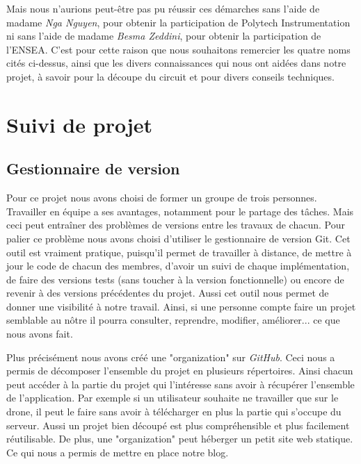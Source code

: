 \documentclass[a4paper,10pt]{report}
\begin{document}
    Mais nous n'aurions peut-être pas pu réussir ces démarches sans l'aide de 
madame \textit{Nga Nguyen}, pour obtenir la participation de Polytech 
Instrumentation ni sans l'aide de madame \textit{Besma Zeddini}, pour obtenir 
la participation de l'ENSEA. C'est pour cette raison que nous souhaitons 
remercier les quatre noms cités ci-dessus, ainsi que les divers connaissances 
qui nous ont aidées dans notre projet, à savoir pour la découpe du circuit et 
pour divers conseils techniques.
   
  \appendix
    \chapter{Suivi de projet}
      \section{Gestionnaire de version}
	Pour ce projet nous avons choisi de former un groupe de trois 
personnes. Travailler en équipe a ses avantages, notamment pour le partage des 
tâches. Mais ceci peut entraîner des problèmes de versions entre les travaux de 
chacun. Pour palier ce problème nous avons choisi d'utiliser le gestionnaire 
de version Git\cite{git}. Cet outil est vraiment pratique, puisqu'il permet de 
travailler à distance, de mettre à jour le code de chacun des membres, d'avoir 
un suivi de chaque implémentation, de faire des versions tests (sans toucher à 
la version fonctionnelle) ou encore de revenir à des versions précédentes du 
projet. Aussi cet outil nous permet de donner une visibilité à notre travail. 
Ainsi, si une personne compte faire un projet semblable au nôtre il pourra 
consulter, reprendre, modifier, améliorer... ce que nous avons fait.

	Plus précisément nous avons créé une "organization"\cite{njordgit} sur 
\textit{GitHub}\cite{github}. Ceci nous a permis de décomposer l'ensemble du 
projet en plusieurs répertoires. Ainsi chacun peut accéder à la partie du 
projet qui l'intéresse sans avoir à récupérer l'ensemble de l'application. Par 
exemple si un utilisateur souhaite ne travailler que sur le drone, il peut le 
faire sans avoir à télécharger en plus la partie qui s'occupe du serveur. Aussi 
un projet bien découpé est plus compréhensible et plus facilement réutilisable. 
De plus, une "organization" peut héberger un petit site web statique. Ce qui 
nous a permis de mettre en place notre blog\cite{njordblog}. 
	
\end{document}
